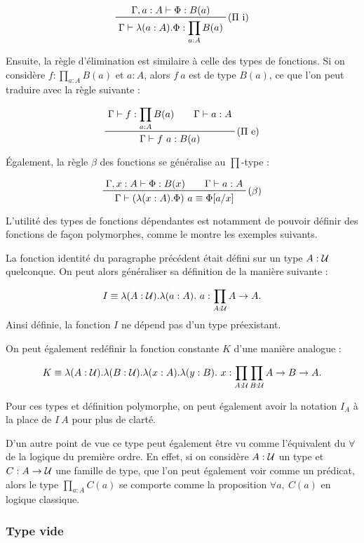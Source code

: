 \documentclass[../../rapport.tex]{subfiles}
\begin{document}
  $$
  \prftree[r]{($\Pi$ i)}{\Gamma, a : A \vdash \Phi : B(a)}
    {\Gamma \vdash \lambda(a : A). \Phi : \prod_{a:A}{B(a)}}
  $$

  Ensuite, la règle d'élimination est similaire à celle des types de fonctions.
  Si on considère $f : \prod_{a:A}B(a)$ et $a : A$, alors $f\ a$ est de type $B(a)$,
  ce que l'on peut traduire avec la règle suivante :

  $$
  \prfinterspace=2em
  \prftree[r]{($\Pi$ e)}{\Gamma \vdash f : \prod_{a:A}{B(a)}}{\Gamma \vdash a : A}
    {\Gamma \vdash f\ a : B(a)}
  $$

  Également, la règle $\beta$ des fonctions se généralise au $\prod$-type :

  $$
  \prfinterspace=2em
  \prftree[r]{($\beta$)}{\Gamma, x : A \vdash \Phi : B(x)}{\Gamma \vdash a : A}
    {\Gamma \vdash (\lambda(x : A).\Phi)\ a \equiv \Phi[a/x]}
  $$

  L'utilité des types de fonctions dépendantes est notamment de pouvoir définir des fonctions de façon polymorphes,
  comme le montre les exemples suivants.

  \begin{example}
    La fonction identité du paragraphe précédent était défini sur un type $A : \mathcal U$ quelconque.
    On peut alors généraliser sa définition de la manière suivante :

    $$I \equiv \lambda (A : \mathcal U). \lambda (a : A).\ a : \prod_{A : \mathcal U}{A \rightarrow A}.$$
    Ainsi définie, la fonction $I$ ne dépend pas d'un type préexistant.

    On peut également redéfinir la fonction constante $K$ d'une manière analogue :

    $$K \equiv \lambda (A : \mathcal U). \lambda (B : \mathcal U). \lambda (x : A). \lambda (y : B).\ x :
      \prod_{A : \mathcal U}\prod_{B : \mathcal U}{A \rightarrow B \rightarrow A}.$$

    Pour ces types et définition polymorphe, on peut également avoir la notation $I_A$ à la place de $I\ A$
    pour plus de clarté.
  \end{example}

  D'un autre point de vue ce type peut également être vu comme l'équivalent du $\forall$ de la logique
  du première ordre.
  En effet, si on considère $A : \mathcal U$ un type et $C : A \rightarrow \mathcal U$ une famille de type,
  que l'on peut également voir comme un prédicat, alors le type $\prod_{a : A}{C(a)}$ se comporte comme
  la proposition $\forall a,\ C(a)$ en logique classique.

  \subsubsection{Type vide}
\end{document}
